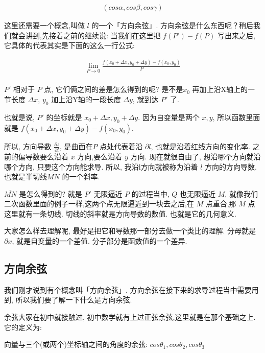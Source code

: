 \begin{align*}
  (cos \alpha, cos \beta, cos \gamma)
\end{align*}

这里还需要一个概念,叫做 $l$ 的一个「方向余弦」. 方向余弦是什么东西呢？稍后我们就会讲到,先接着之前的继续说: 当我们在这里把 $f(P') - f(P)$ 写出来之后, 它具体的代表其实是下面的这么一行公式: 

\begin{align*}
  \lim_{P \to 0} \frac{f(x_0 + \Delta x, y_0+\Delta y) - f(x_0, y_0)}{P} \\
\end{align*}

$P'$ 相对于 $P$ 点, 它们俩之间的差是怎么得到的呢? 是不是$x_0$ 再加上沿X轴上的一节长度 $\Delta x$, $y_0$ 加上沿Y轴的一段长度 $\Delta y$, 就到达 $P'$ 了. 

也就是说, $P'$ 的坐标就是 $x_0 + \Delta x, y_0+\Delta y$. 因为自变量是两个 $x, y$, 所以函数里面就是 $f(x_0 + \Delta x, y_0+\Delta y) - f(x_0, y_0)$. 

所以, 方向导数 $\frac{\partial z}{\partial l}$, 是曲面在$P$ 点处代表着沿 $\partial l$, 也就是沿着红线方向的变化率. 之前的偏导数要么沿着 $x$ 方向,要么沿着 $y$ 方向. 现在就很自由了, 想沿哪个方向就沿哪个方向, 只要这个方向能求导. 所以, 我沿l方向就被称为沿着 $l$ 方向的方向导数. 也就是半切线$\overline {MN}$ 的一个斜率. 

$\overline {MN}$ 是怎么得到的? 就是 $P'$ 无限逼近 $P$ 的过程当中, $Q$ 也无限逼近 $M$, 就像我们二次函数里面的例子一样,这两个点无限逼近到一块去之后,在 $M$ 点重合,那 $M$ 点这里就有一条切线. 切线的斜率就是方向导数的数值. 也就是它的几何意义. 

大家怎么样去理解呢, 最好是把它和导数那一部分去做一个类比的理解. 分母就是 $\partial x$, 就是自变量的一个差值. 分子部分是函数值的一个差异. 

\subsection{方向余弦}

我们刚才说到有个概念叫「方向余弦」. 方向余弦在接下来的求导过程当中需要用到, 所以我们要了解一下什么是方向余弦. 

余弦大家在初中就接触过, 初中数学就有上过正弦余弦,这里就是在那个基础之上. 它的定义为: 

\begin{newquotation}
  向量与三个(或两个)坐标轴之间的角度的余弦: $cos \theta_1, cos \theta_2, cos \theta_3$
\end{newquotation}

